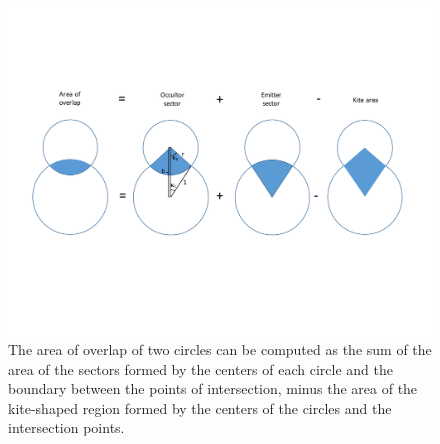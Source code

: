 \documentclass[modern]{aastex61}
\begin{document}
\begin{figure}
    \begin{centering}
    \includegraphics[width=\linewidth]{Circle_overlap_area.pdf}
    \caption{The area of overlap of two circles can be computed as the sum of
    the area of the sectors formed by the centers of each circle and the
    boundary between the points of intersection, minus the area of the kite-shaped
    region formed by the centers of the circles and the intersection points.}\label{fig:circle_overlap}
    \end{centering} 
\end{figure}
\end{document}
